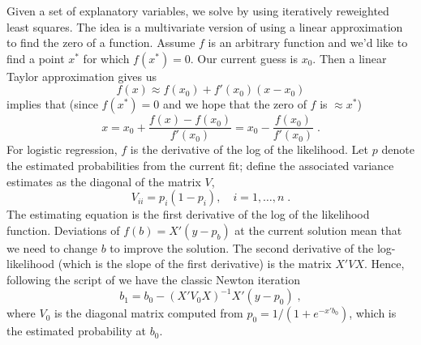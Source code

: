 \documentclass[12pt]{article}
\begin{document}
 Given a set of explanatory variables, we solve  by using
 iteratively reweighted least squares.  The idea is a multivariate version of
 using a linear approximation to find the zero of a function.  Assume $f$ is an
 arbitrary function and we'd like to find a point $x^{*}$ for which $f(x^{*}) =
 0$.  Our current guess is $x_0$. Then a linear Taylor approximation gives us
\begin{displaymath}
  f(x) \approx f(x_0) + f'(x_0)(x - x_0)
\end{displaymath}
 implies that (since $f(x^{*}) = 0$ and we hope that the zero of $f$ is $\approx
 x^{*}$)
\begin{equation}
  x = x_0 + \frac{f(x)-f(x_0)}{f'(x_0)} = x_0-\frac{f(x_0)}{f'(x_0)} \;.
\label{eq:newton}
\end{equation}
 For logistic regression, $f$ is the derivative of the log of the likelihood.
  Let $p$ denote the estimated probabilities from the current fit; define the
 associated variance estimates as the diagonal of the matrix $V$,
\begin{displaymath}
  V_{ii} = p_i (1-p_i), \quad i=1,\ldots, n\;.
\end{displaymath}
 The estimating equation  is the first derivative of the log of
 the likelihood function.  Deviations of $f(b) = X'(y-p_b)$ at the current
 solution mean that we need to change $b$ to improve the solution. The second
 derivative of the log-likelihood (which is the slope of the first derivative)
 is the matrix $X'VX$.  Hence, following the script of  we have
 the classic Newton iteration
\begin{equation}
  b_1 = b_0 - (X'V_0X)^{-1}X'(y-p_0) \;,
\label{eq:newton}
\end{equation}
 where $V_0$ is the diagonal matrix computed from $p_0 = 1/(1+e^{-x'b_0})$,
 which is the estimated probability at $b_0$.
\end{document}
